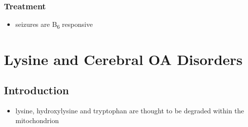\documentclass{scrartcl}
\begin{document}
\subsubsection{Treatment}
\label{sec:org435ac87}
\begin{itemize}
\item seizures are B\textsubscript{6} responsive
\end{itemize}

\section{Lysine and Cerebral OA Disorders}
\label{sec:orgb324408}
\subsection{Introduction}
\label{sec:org67d70fc}
\begin{itemize}
\item lysine, hydroxylysine and tryptophan are thought to be degraded
within the mitochondrion
\end{itemize}

\chemnameinit{}
\end{document}
